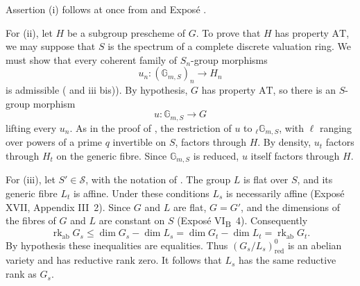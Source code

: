 
Assertion \textup{(i)} follows at once from  and
Exposé .

For \textup{(ii)}, let \(H\) be a subgroup prescheme of \(G\). To
prove that \(H\) has property \(\mathrm{AT}\), we may suppose that
\(S\) is the spectrum of a complete discrete valuation ring. We
must show that every coherent family of \(S_n\)-group morphisms
\[
  u_n:(\mathbb G_{m,S})_n\longrightarrow H_n
\]
is admissible ( and  \textup{iii bis)}).
By hypothesis, \(G\) has property \(\mathrm{AT}\), so there is an
\(S\)-group morphism
\[
  u:\mathbb G_{m,S}\longrightarrow G
\]
lifting every \(u_n\). As in the proof of , the
restriction of \(u\) to \({}_\ell\mathbb G_{m,S}\), with \(\ell\)
ranging over powers of a prime \(q\) invertible on \(S\), factors
through \(H\). By density, \(u_t\) factors through \(H_t\) on the
generic fibre. Since \(\mathbb G_{m,S}\) is reduced, \(u\) itself
factors through \(H\).

For \textup{(iii)}, let \(S'\in\mathcal S\), with the notation of
. The group \(L\) is flat over \(S\), and its generic
fibre \(L_t\) is affine. Under these conditions \(L_s\) is
necessarily affine (Exposé XVII, Appendix III~2). Since \(G\) and
\(L\) are flat, \(G=G'\), and the dimensions of the fibres of \(G\)
and \(L\) are constant on \(S\) (Exposé VI\textsubscript{B}~4).
Consequently
\[
 \operatorname{rk}_{\mathrm{ab}}G_s
 \leq \dim G_s-\dim L_s
 =\dim G_t-\dim L_t
 =\operatorname{rk}_{\mathrm{ab}}G_t.
\]
By hypothesis these inequalities are equalities. Thus
\((G_s/L_s)^0_{\mathrm{red}}\) is an abelian variety and has
reductive rank zero. It follows that \(L_s\) has the same reductive
rank as \(G_s\).

